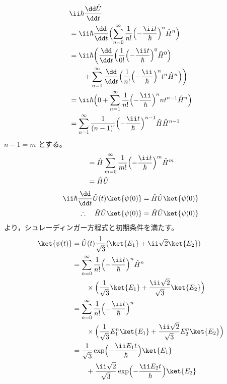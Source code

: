 \begin{align*}
&\ii\hbar\frac{\dd\hat{U}}{\dd t}\\
&=\ii\hbar\frac{\dd}{\dd t}\Bigl(\sum_{n=0}^{\infty}\frac{1}{n!}\Bigl(-\frac{\ii t}{\hbar}\Bigr)^{n}\hat{H}^{n}\Bigr)\\
&=\ii\hbar\biggl(\frac{\dd}{\dd t}\Bigl(\frac{1}{0!}\Bigl(-\frac{\ii t}{\hbar}\Bigr)^{0}\hat{H}^{0}\Bigr)\\
&\qquad+\sum_{n=1}^{\infty}\frac{\dd}{\dd t}\Bigl(\frac{1}{n!}\Bigl(-\frac{\ii}{\hbar}\Bigr)^{n}t^{n}\hat{H}^{n}\Bigr)\biggr)\\
&=\ii\hbar\Bigl(0+\sum_{n=1}^{\infty}\frac{1}{n!}\Bigl(-\frac{\ii}{\hbar}\Bigr)^{n}nt^{n-1}\hat{H}^{n}\Bigr)\\
&=\sum_{n=1}^{\infty}\frac{1}{(n-1)!}\Bigl(-\frac{\ii t}{\hbar}\Bigr)^{n-1}\hat{H}\hat{H}^{n-1}
\end{align*}
$n-1=m$ とする。
\begin{align*}
&=\hat{H}\sum_{m=0}^{\infty}\frac{1}{m!}\Bigl(-\frac{\ii t}{\hbar}\Bigr)^{m}\hat{H}^{m}\\
&=\hat{H}\hat{U}
\end{align*}
\begin{align*}
\ii\hbar\frac{\dd}{\dd t}\hat{U}(t)\ket{\psi(0)}&=\hat{H}\hat{U}\ket{\psi(0)}\\
\therefore\quad\hat{H}\hat{U}\ket{\psi(0)}&=\hat{H}\hat{U}\ket{\psi(0)}
\end{align*}
より，シュレーディンガー方程式と初期条件を満たす。
\begin{align*}
\ket{\psi(t)}&=\hat{U}(t)\frac{1}{\sqrt{3}}(\ket{E_{1}}+\ii\sqrt{2}\ket{E_{2}})\\
&=\sum_{n=0}^{\infty}\frac{1}{n!}\Bigl(-\frac{\ii t}{\hbar}\Bigr)^{n}\hat{H}^{n}\\
&\qquad\times\Bigl(\frac{1}{\sqrt{3}}\ket{E_{1}}+\frac{\ii\sqrt{2}}{\sqrt{3}}\ket{E_{2}}\Bigr)\\
&=\sum_{n=0}^{\infty}\frac{1}{n!}\Bigl(-\frac{\ii t}{\hbar}\Bigr)^{n}\\
&\qquad\times\Bigl(\frac{1}{\sqrt{3}}E_{1}^{n}\ket{E_{1}}+\frac{\ii\sqrt{2}}{\sqrt{3}}E_{2}^{n}\ket{E_{2}}\Bigr)\\
&=\frac{1}{\sqrt{3}}\exp\Bigl(-\frac{\ii E_{1}t}{\hbar}\Bigr)\ket{E_{1}}\\
&\qquad+\frac{\ii\sqrt{2}}{\sqrt{3}}\exp\Bigl(-\frac{\ii E_{2}t}{\hbar}\Bigr)\ket{E_{2}}
\end{align*}
